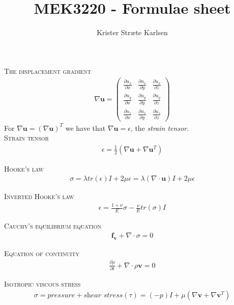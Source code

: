 \documentclass[11pt,a4paper,english]{article}
\title{MEK3220 - Formulae sheet}
\author{Krister Stræte Karlsen}
\begin{document}
\maketitle

{\scshape The displacement gradient} 
\begin{align*}
\nabla \mathbf{u} = 
\begin{pmatrix}	    \frac{\partial u_x}{ \partial x} & \frac{\partial u_x}{ \partial y} & \frac{\partial u_x}{ \partial z}      \\
                		\frac{\partial u_y}{ \partial x} & \frac{\partial u_y}{ \partial y} & \frac{\partial u_y}{ \partial z}     \\
               	 	\frac{\partial u_z}{ \partial x} & \frac{\partial u_z}{ \partial y} &\frac{\partial u_z}{ \partial z}     
\end{pmatrix}
\end{align*}
\hspace{1cm} For $ \nabla \mathbf{u} =  ( \nabla \mathbf{u})^T  $ we have that $\nabla \mathbf{u} = \epsilon $, the \emph{strain tensor}.\\

{\scshape Strain tensor} 
\begin{align*}
\epsilon = \frac{1}{2}(\nabla \mathbf{u} + \nabla \mathbf{u}^T  ) 
\end{align*}

{\scshape Hooke's law} 
\begin{align*}
\sigma  = \lambda tr(\epsilon) I + 2\mu \epsilon =  \lambda (\nabla \cdot \mathbf{u}) I + 2\mu \epsilon
\end{align*}

{\scshape Inverted Hooke's law} 
\begin{align*}
\epsilon = \frac{1+\nu}{E}\sigma - \frac{\nu}{E} tr(\sigma)I   
\end{align*}

{\scshape Cauchy's equilibrium equation} 
\begin{align*}
\mathbf{f_v} + \nabla \cdot \sigma = 0
\end{align*}

{\scshape Equation of continuity} 
\begin{align*}
\frac{\partial \rho}{\partial t} + \nabla \cdot  \rho \mathbf{v} = 0
\end{align*}

{\scshape Isotropic viscous stress} 
\begin{align*}
\sigma = pressure + \textit{shear stress}(\tau) =  (-p)I + \mu (\nabla \mathbf{v}  + \nabla \mathbf{v}^T  )
\end{align*}
\end{document}
